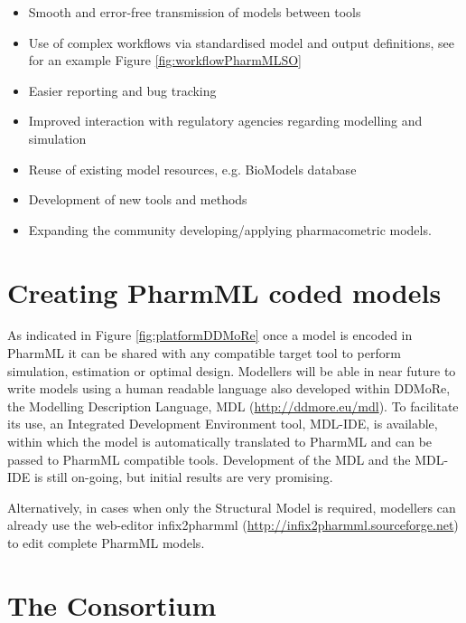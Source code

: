 \begin{itemize}
\item
Smooth and error-free transmission of models between tools
\item
Use of complex workflows via standardised model and output definitions, 
see for an example Figure \ref{fig:workflowPharmMLSO}
\item
Easier reporting and bug tracking
\item
Improved interaction with regulatory agencies regarding modelling and simulation
\item
Reuse of existing model resources, e.g. BioModels database
\item
Development of new tools and methods
\item
Expanding the community developing/applying pharmacometric models.
\end{itemize}


\section{Creating PharmML coded models}
\label{intro:creatingPharmML}

As indicated in Figure \ref{fig:platformDDMoRe} once a model is encoded 
in PharmML it can be shared with any compatible target tool to perform simulation, 
estimation or optimal design. Modellers will be able in near future to write models 
using a human readable language also developed within DDMoRe, the 
Modelling Description Language, MDL (\url{http://ddmore.eu/mdl}). To facilitate its use, 
an Integrated Development Environment tool, MDL-IDE, is available, within which 
the model is automatically translated to PharmML and can be passed to PharmML 
compatible tools. Development of the MDL and the MDL-IDE is still on-going, 
but initial results are very promising. 

Alternatively, in cases when only the Structural Model is required, modellers can 
already use the web-editor infix2pharmml (\url{http://infix2pharmml.sourceforge.net}) 
to edit complete PharmML models. 


\section{The \ddmore Consortium}



